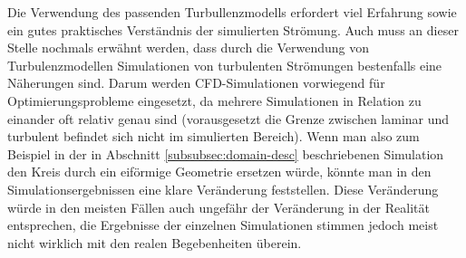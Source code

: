 Die Verwendung des passenden Turbullenzmodells erfordert viel Erfahrung sowie ein gutes 
praktisches Verständnis der simulierten Strömung. Auch muss an dieser Stelle nochmals erwähnt werden,
dass durch die Verwendung von Turbulenzmodellen Simulationen von turbulenten Strömungen bestenfalls eine Näherungen sind.
Darum werden CFD-Simulationen vorwiegend für Optimierungsprobleme eingesetzt, da mehrere Simulationen in Relation zu einander
oft relativ genau sind (vorausgesetzt die Grenze zwischen laminar und turbulent befindet sich nicht im simulierten Bereich).
Wenn man also zum Beispiel in der in Abschnitt \ref{subsubsec:domain-desc} beschriebenen Simulation den Kreis durch ein
eiförmige Geometrie ersetzen würde, könnte man in den Simulationsergebnissen eine klare Veränderung feststellen.
Diese Veränderung würde in den meisten Fällen auch ungefähr der Veränderung in der Realität entsprechen,
die Ergebnisse der einzelnen Simulationen stimmen jedoch meist nicht wirklich mit den realen Begebenheiten überein.


